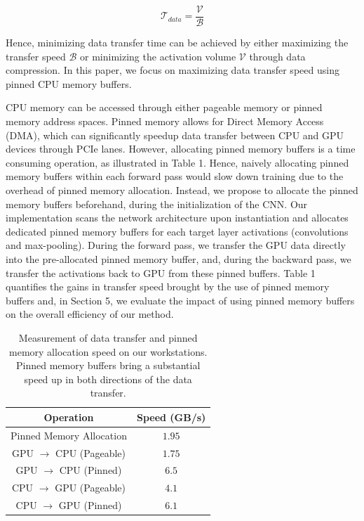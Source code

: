 \documentclass[11pt,onecolumn]{article}
\begin{document}
\begin{equation}
\mathcal{T}_{data} = \frac{\mathcal{V}}{\mathcal{B}}
\end{equation}

Hence, minimizing data transfer time can be achieved by either
maximizing the transfer speed $\mathcal{B}$ or minimizing
the activation volume $\mathcal{V}$ through data compression.
In this paper, we focus on maximizing data transfer speed using pinned
CPU memory buffers.

CPU memory can be accessed through either pageable memory 
or pinned memory address spaces.
Pinned memory allows for Direct Memory Access (DMA), 
which can significantly speedup data transfer between CPU and GPU devices through PCIe lanes.
However, allocating pinned memory buffers is a time consuming operation, as illustrated in Table 1.
Hence, naively allocating pinned memory buffers within each forward pass would
slow down training due to the overhead of pinned memory allocation.
Instead, we propose to allocate the pinned memory buffers beforehand, 
during the initialization of the CNN.
Our implementation scans the network architecture upon instantiation
and allocates dedicated pinned memory buffers for each 
target layer activations (convolutions and max-pooling). 
During the forward pass, we transfer the GPU data directly into the pre-allocated pinned memory buffer,
and, during the backward pass, we transfer the activations back to GPU from these pinned buffers.
Table 1 quantifies the gains in transfer speed brought by the use of pinned memory buffers and, in Section 5, we evaluate the impact of using pinned memory buffers on the overall efficiency of our method.

\begin{table}[t]
\begin{center}
\begin{tabular}{ c c }	
\hline
Operation     & Speed (GB/s)  \\
\hline
Pinned Memory Allocation     		&  $1.95$        \\
GPU $\rightarrow$ CPU (Pageable)	&  $1.75$        \\
GPU $\rightarrow$ CPU (Pinned)	        &  $6.5$          \\
CPU $\rightarrow$ GPU (Pageable)	&  $4.1$          \\
CPU $\rightarrow$ GPU (Pinned)	        &  $6.1$          \\
\hline
\end{tabular}
\caption{Measurement of data transfer and pinned memory allocation speed on our workstations.
Pinned memory buffers bring a substantial speed up in both directions of the data transfer.}
\end{center}
\end{table}
\end{document}
